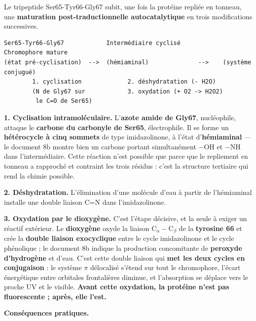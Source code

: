 \documentclass[11pt,a4paper]{article}
\begin{document}
Le tripeptide Ser65-Tyr66-Gly67 subit, une fois la protéine repliée en tonneau, une \textbf{maturation post-traductionnelle autocatalytique} en trois modifications successives.

\begin{lstlisting}
Ser65-Tyr66-Gly67            Intermédiaire cyclisé            Chromophore mature
(état pré-cyclisation)  -->  (hémiaminal)              -->    (système conjugué)
        1. cyclisation             2. déshydratation (- H2O)
        (N de Gly67 sur            3. oxydation (+ O2 -> H2O2)
         le C=O de Ser65)
\end{lstlisting}

\textbf{1. Cyclisation intramoléculaire.} L'\textbf{azote amide de Gly67}, nucléophile, attaque le \textbf{carbone du carbonyle de Ser65}, électrophile. Il se forme un \textbf{hétérocycle à cinq sommets} de type imidazolinone, à l'état d'\textbf{hémiaminal} --- le document 8b montre bien un carbone portant simultanément \(-\)OH et \(-\)NH dans l'intermédiaire. Cette réaction n'est possible que parce que le repliement en tonneau a rapproché et contraint les trois résidus : c'est la structure tertiaire qui rend la chimie possible.

\textbf{2. Déshydratation.} L'élimination d'une molécule d'eau à partir de l'hémiaminal installe une double liaison C=N dans l'imidazolinone.

\textbf{3. Oxydation par le dioxygène.} C'est l'étape décisive, et la seule à exiger un réactif extérieur. Le \textbf{dioxygène} oxyde la liaison \({\mathrm{C}}_\alpha-{\mathrm{C}}_\beta\) de la \textbf{tyrosine 66} et crée la \textbf{double liaison exocyclique} entre le cycle imidazolinone et le cycle phénolique ; le document 8b indique la production concomitante de \textbf{peroxyde d'hydrogène} et d'eau. C'est cette double liaison qui \textbf{met les deux cycles en conjugaison} : le système \(\pi\) délocalisé s'étend sur tout le chromophore, l'écart énergétique entre orbitales frontalières diminue, et l'absorption se déplace vers le proche UV et le visible. \textbf{Avant cette oxydation, la protéine n'est pas fluorescente ; après, elle l'est.}

\textbf{Conséquences pratiques.}
\end{document}

